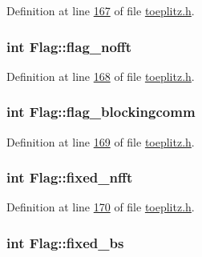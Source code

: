 Definition at line \hyperlink{toeplitz_8h_source_l00167}{167} of file \hyperlink{toeplitz_8h_source}{toeplitz.\-h}.

\hypertarget{structFlag_ae6ae474d648b80963df05ac9bcf64e48}{
\subsubsection[{flag\-\_\-nofft}]{\setlength{\rightskip}{0pt plus 5cm}int Flag\-::flag\-\_\-nofft}}\label{structFlag_ae6ae474d648b80963df05ac9bcf64e48}


Definition at line \hyperlink{toeplitz_8h_source_l00168}{168} of file \hyperlink{toeplitz_8h_source}{toeplitz.\-h}.

\hypertarget{structFlag_a9a3d002dea599c154b60af540c868cb5}{
\subsubsection[{flag\-\_\-blockingcomm}]{\setlength{\rightskip}{0pt plus 5cm}int Flag\-::flag\-\_\-blockingcomm}}\label{structFlag_a9a3d002dea599c154b60af540c868cb5}


Definition at line \hyperlink{toeplitz_8h_source_l00169}{169} of file \hyperlink{toeplitz_8h_source}{toeplitz.\-h}.

\hypertarget{structFlag_a3e8ec6d9ff8ecf0ceff5de51ca98e65b}{
\subsubsection[{fixed\-\_\-nfft}]{\setlength{\rightskip}{0pt plus 5cm}int Flag\-::fixed\-\_\-nfft}}\label{structFlag_a3e8ec6d9ff8ecf0ceff5de51ca98e65b}


Definition at line \hyperlink{toeplitz_8h_source_l00170}{170} of file \hyperlink{toeplitz_8h_source}{toeplitz.\-h}.

\hypertarget{structFlag_a32e56c6cf96b69f4dd6e0f2dcdb88678}{
\subsubsection[{fixed\-\_\-bs}]{\setlength{\rightskip}{0pt plus 5cm}int Flag\-::fixed\-\_\-bs}}\label{structFlag_a32e56c6cf96b69f4dd6e0f2dcdb88678}


